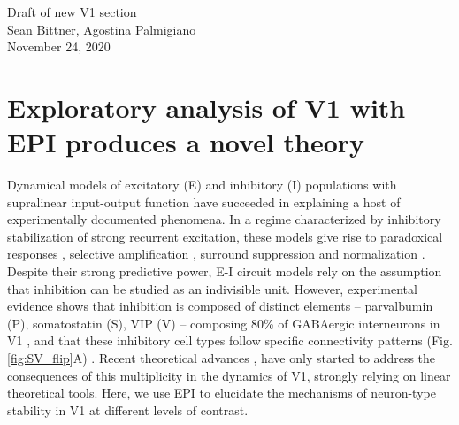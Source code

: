 \documentclass[11pt]{article}
\begin{document}
\medskip                        %

\thispagestyle{plain}
\begin{center}                  %
{\Large Draft of new V1 section} \\
Sean Bittner, Agostina Palmigiano \\
November 24, 2020 \\
\end{center}

\section{Exploratory analysis of V1 with EPI produces a novel theory}\label{results_V1}
Dynamical models of excitatory (E) and inhibitory (I) populations with supralinear input-output function have succeeded in explaining a host of experimentally documented phenomena.
In a regime characterized by inhibitory stabilization of strong recurrent excitation, these models give rise to paradoxical responses \cite{tsodyks1997paradoxical}, selective amplification  \cite{goldman2009memory, murphy2009balanced}, surround suppression \cite{ozeki2009inhibitory} and normalization \cite{rubin2015stabilized}. 
Despite their strong predictive power, E-I circuit models rely on the assumption that inhibition can be studied as an indivisible unit. 
However, experimental evidence shows that inhibition is composed of distinct elements -- parvalbumin (P), somatostatin (S), VIP (V) --
composing 80\% of GABAergic interneurons in V1 \cite{markram2004interneurons, rudy2011three, tremblay2016}, and that these inhibitory cell types follow specific connectivity patterns (Fig. \ref{fig:SV_flip}A) \cite{pfeffer2013inhibition}.
Recent theoretical advances \cite{litwin2016inhibitory, GarciaDelMolino2017, Chen2019},  have only started to address the consequences of this multiplicity in the dynamics of V1, strongly relying on linear theoretical tools. 
Here, we use EPI to elucidate the mechanisms of neuron-type stability in V1 at different levels of contrast.
\end{document}
